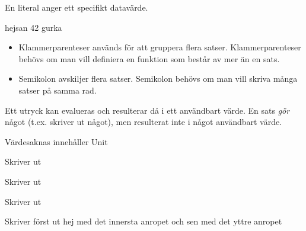 
\ExerciseSolution{\ExeWeekONE}



\Task En literal anger ett specifikt datavärde.
 
\Task %

\Subtask  {}

\Subtask  {}

\Subtask  {}

\Subtask  {}

\Subtask  {}

\Subtask  {}

\Subtask  {}

\Subtask  {}

\Subtask  {}

\Subtask  {}

\Subtask  {}

\Task  
\begin{REPLnonum}
hejsan
42
gurka
\end{REPLnonum}
\begin{itemize}[noitemsep,nolistsep]
\item Klammerparenteser används för att gruppera flera satser. Klammerparenteser behövs om man vill definiera en funktion som består av mer än en sats. 

\item Semikolon avskiljer flera satser. Semikolon behövs om man vill skriva många satser på samma rad.
\end{itemize}
\Task %

\Subtask  Ett utryck kan evalueras och resulterar då i ett användbart värde. En sats \emph{gör} något (t.ex. skriver ut något), men resulterat inte i något användbart värde.

\Subtask {}

\Subtask 

 Värdesaknas innehåller Unit

 Skriver ut 

 Skriver ut 

 Skriver ut 

 Skriver först ut hej med det innersta anropet och sen \code{()} med det yttre anropet

\Subtask  {}

